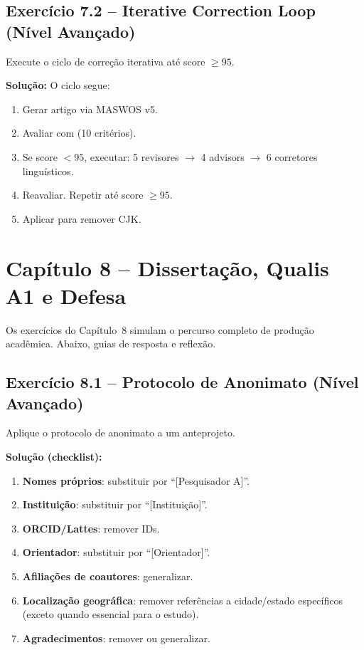 \subsection*{Exercício 7.2 -- Iterative Correction Loop (Nível Avançado)}
Execute o ciclo de correção iterativa até score $\geq 95$.

\textbf{Solução:} O ciclo segue:
\begin{enumerate}
\item Gerar artigo via MASWOS v5.
\item Avaliar com  (10 critérios).
\item Se score $< 95$, executar: 5 revisores $\to$ 4 advisors $\to$ 6
corretores linguísticos.
\item Reavaliar. Repetir até score $\geq 95$.
\item Aplicar  para remover CJK.
\end{enumerate}

\section*{Capítulo 8 -- Dissertação, Qualis A1 e Defesa}

Os exercícios do Capítulo~8 simulam o percurso completo de produção
acadêmica. Abaixo, guias de resposta e reflexão.

\subsection*{Exercício 8.1 -- Protocolo de Anonimato (Nível Avançado)}
Aplique o protocolo de anonimato a um anteprojeto.

\textbf{Solução (checklist):}
\begin{enumerate}
\item \textbf{Nomes próprios}: substituir por ``[Pesquisador A]''.
\item \textbf{Instituição}: substituir por ``[Instituição]''.
\item \textbf{ORCID/Lattes}: remover IDs.
\item \textbf{Orientador}: substituir por ``[Orientador]''.
\item \textbf{Afiliações de coautores}: generalizar.
\item \textbf{Localização geográfica}: remover referências a cidade/estado
       específicos (exceto quando essencial para o estudo).
\item \textbf{Agradecimentos}: remover ou generalizar.
\end{enumerate}

